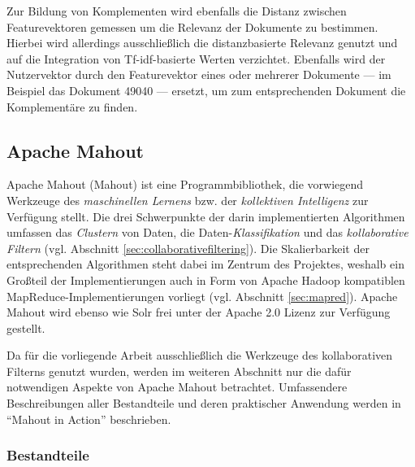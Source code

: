 

Zur Bildung von Komplementen wird ebenfalls die Distanz zwischen Featurevektoren gemessen um die Relevanz der Dokumente zu bestimmen. Hierbei wird allerdings ausschließlich die distanzbasierte Relevanz genutzt und auf die Integration von Tf-idf-basierte Werten verzichtet. Ebenfalls wird der Nutzervektor durch den Featurevektor eines oder mehrerer Dokumente --- im Beispiel das Dokument 49040 --- ersetzt, um zum entsprechenden Dokument die Komplementäre zu finden.



\subsection{Apache Mahout} \label{sec:mahout}

Apache Mahout (Mahout) ist eine Programmbibliothek, die vorwiegend Werkzeuge des \textit{maschinellen Lernens} bzw. der \textit{kollektiven Intelligenz} zur Verfügung stellt. Die drei Schwerpunkte der darin implementierten Algorithmen umfassen das \textit{Clustern} von Daten, die Daten-\textit{Klassifikation} und das \textit{kollaborative Filtern} (vgl. Abschnitt \ref{sec:collaborativefiltering}). Die Skalierbarkeit der entsprechenden Algorithmen steht dabei im Zentrum des Projektes, weshalb ein Großteil der Implementierungen auch in Form von Apache Hadoop kompatiblen MapReduce-Implementierungen vorliegt (vgl. Abschnitt \ref{sec:mapred}). Apache Mahout wird ebenso wie Solr frei unter der Apache 2.0 Lizenz zur Verfügung gestellt. \citep{mia}

Da für die vorliegende Arbeit ausschließlich die Werkzeuge des kollaborativen Filterns genutzt wurden, werden im weiteren Abschnitt nur die dafür notwendigen Aspekte von Apache Mahout betrachtet. Umfassendere Beschreibungen aller Bestandteile und deren praktischer Anwendung werden in ``Mahout in Action'' \citep{mia} beschrieben.

\subsubsection{Bestandteile} \label{sec:mahoutparts}

